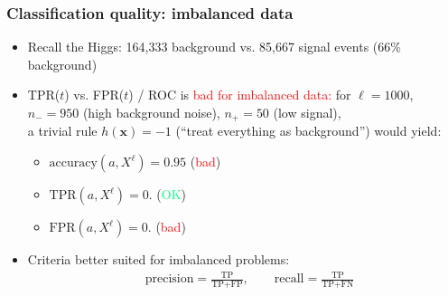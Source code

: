 \documentclass[usenames,dvipsnames,aspectratio=169]{beamer}
\begin{document}
\begin{frame}
\frametitle{Classification quality: imbalanced data}

\begin{itemize}
    \item Recall the Higgs: 164,333 background vs.
    85,667 signal events (66\% background)

    \pause
    \item TPR($t$) vs. FPR($t$) / ROC
    is \textcolor{red}{bad for imbalanced data:}
    for $\ell = 1000$,\\
    $n_{-} = 950$ (high background noise),
    $n_{+} = 50$ (low signal),\\
    a trivial rule $h(\mathbf{x}) = -1$ (``treat everything as background'')
    would yield:
    \begin{itemize}
        \pause
        \item $\text{accuracy}(a, X^\ell) = 0.95$ (\textcolor{red}{bad})

        \pause
        \item $\text{TPR}(a, X^\ell) = 0.$ (\textcolor{SpringGreen}{OK})

        \pause
        \item $\text{FPR}(a, X^\ell) = 0.$ (\textcolor{red}{bad})
    \end{itemize}

    \pause
    \item Criteria better suited for imbalanced problems:
    \begin{align*}
        &\text{precision}
        =
        \frac{
            \text{TP}
        }{
            \text{TP} + \text{FP}
        }, \qquad
        \text{recall}
        =
        \frac{
            \text{TP}
        }{
            \text{TP} + \text{FN}
        }
    \end{align*}

\end{itemize}

\end{frame}
\end{document}

